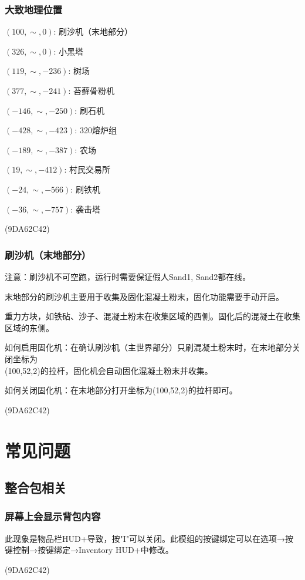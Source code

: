 \documentclass[UTF8,a4paper]{article}
\begin{document}
			\subsubsection{大致地理位置}
				\par $(100,\sim,0)$: 刷沙机（末地部分）
				\par $(326,\sim,0)$: 小黑塔
				\par $(119,\sim,-236)$: 树场
				\par $(377,\sim,-241)$: 苔藓骨粉机
				\par $(-146,\sim,-250)$: 刷石机
				\par $(-428,\sim,-423)$: 320熔炉组
				\par $(-189,\sim,-387)$: 农场
				\par $(19,\sim,-412)$: 村民交易所
				\par $(-24,\sim,-566)$: 刷铁机
				\par $(-36,\sim,-757)$: 袭击塔
				\begin{flushright}(9DA62C42)\end{flushright}
			\subsubsection{刷沙机（末地部分）}
				\par 注意：刷沙机不可空跑，运行时需要保证假人Sand1, Sand2都在线。
				\par 末地部分的刷沙机主要用于收集及固化混凝土粉末，固化功能需要手动开启。
				\par 重力方块，如铁砧、沙子、混凝土粉末在收集区域的西侧。固化后的混凝土在收集区域的东侧。
				\par 如何启用固化机：在确认刷沙机（主世界部分）只刷混凝土粉末时，在末地部分关闭坐标为 \\ (100,52,2)的拉杆，固化机会自动固化混凝土粉末并收集。
				\par 如何关闭固化机：在末地部分打开坐标为(100,52,2)的拉杆即可。
				\begin{flushright}(9DA62C42)\end{flushright}
	\section{常见问题}
		\subsection{整合包相关}
			\subsubsection{屏幕上会显示背包内容}
				\par 此现象是物品栏HUD+导致，按"I"可以关闭。此模组的按键绑定可以在选项→按键控制→按键绑定→Inventory HUD+中修改。
				\begin{flushright}(9DA62C42)\end{flushright}
\end{document}
